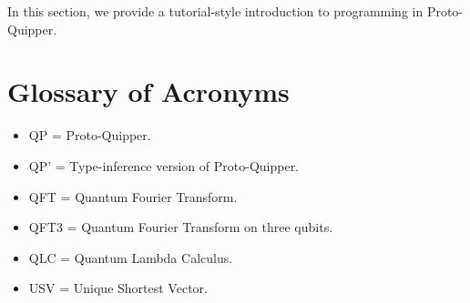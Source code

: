 \documentclass{article}
\begin{document}
In this section, we provide a tutorial-style introduction to 
programming in Proto-Quipper. 



\section*{Glossary of Acronyms}

\begin{itemize}
  \item QP = Proto-Quipper.
  \item QP' = Type-inference version of Proto-Quipper.
  \item QFT = Quantum Fourier Transform.
  \item QFT3 = Quantum Fourier Transform on three qubits.
  \item QLC = Quantum Lambda Calculus.
  \item USV = Unique Shortest Vector.
\end{itemize}

{}

\end{document}
